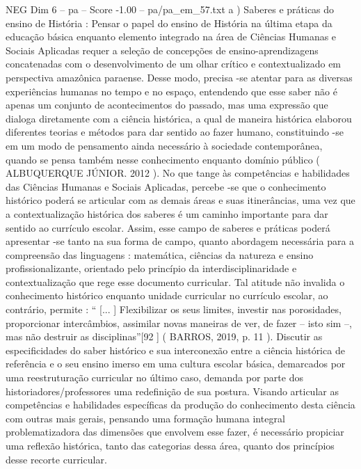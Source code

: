 \begin{textsample}{NEG Dim 6 – pa – Score -1.00 – pa/pa\_em\_57.txt}  \label{ex:f6_neg_221}
a ) Saberes e práticas do ensino de História : Pensar o papel do ensino de História na última etapa da educação básica enquanto elemento integrado na área de Ciências Humanas e Sociais Aplicadas requer a seleção de concepções de ensino-aprendizagens concatenadas com o desenvolvimento de um olhar crítico e contextualizado em perspectiva amazônica paraense.
Desse modo, precisa -se atentar para as diversas experiências humanas no tempo e no espaço, entendendo que esse saber não é apenas um conjunto de acontecimentos do passado, mas uma expressão que dialoga diretamente com a ciência histórica, a qual de maneira histórica elaborou diferentes teorias e métodos para dar sentido ao fazer humano, constituindo -se em um modo de pensamento ainda necessário à sociedade contemporânea, quando se pensa também nesse conhecimento enquanto domínio público ( ALBUQUERQUE JÚNIOR. 2012 ).
No que tange às competências e habilidades das Ciências Humanas e Sociais Aplicadas, percebe -se que o conhecimento histórico poderá se articular com as demais áreas e suas itinerâncias, uma vez que a contextualização histórica dos saberes é um caminho importante para dar sentido ao currículo escolar.
Assim, esse campo de saberes e práticas poderá apresentar -se tanto na sua forma de campo, quanto abordagem necessária para a compreensão das linguagens : matemática, ciências da natureza e ensino profissionalizante, orientado pelo princípio da interdisciplinaridade e contextualização que rege esse documento curricular.
Tal atitude não invalida o conhecimento histórico enquanto unidade curricular no currículo escolar, ao contrário, permite : “ [... ] Flexibilizar os seus limites, investir nas porosidades, proporcionar intercâmbios, assimilar novas maneiras de ver, de fazer – isto sim –, mas não destruir as disciplinas”[92 ] ( BARROS, 2019, p. 11 ).
Discutir as especificidades do saber histórico e sua interconexão entre a ciência histórica de referência e o seu ensino imerso em uma cultura escolar básica, demarcados por uma reestruturação curricular no último caso, demanda por parte dos historiadores/professores uma redefinição de sua postura.
Visando articular as competências e habilidades específicas da produção do conhecimento desta ciência com outras mais gerais, pensando uma formação humana integral problematizadora das dimensões que envolvem esse fazer, é necessário propiciar uma reflexão histórica, tanto das categorias dessa área, quanto dos princípios desse recorte curricular.

\end{textsample}

